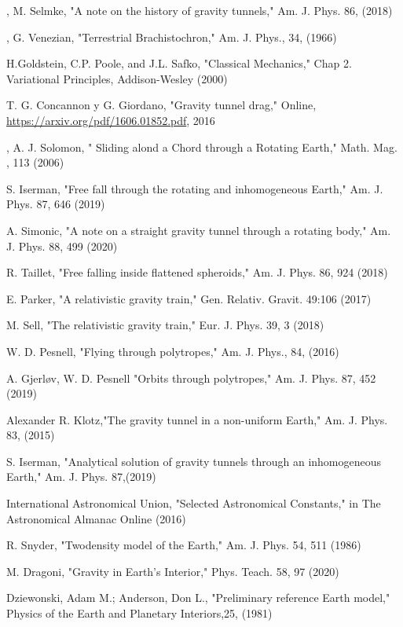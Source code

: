 \documentclass[aps,twocolumn,showpacs,preprintnumbers]{revtex4}
\begin{document}
\begin{thebibliography}{10}

, M. Selmke, "A note on the history of gravity tunnels," Am. J. Phys. 86, (2018)


, G. Venezian, "Terrestrial Brachistochron," Am. J. Phys., 34, (1966)

 H.Goldstein, C.P. Poole, and J.L. Safko, "Classical Mechanics," Chap 2. Variational Principles, Addison-Wesley (2000)

 T. G. Concannon y G. Giordano, "Gravity tunnel drag," Online, \url{https://arxiv.org/pdf/1606.01852.pdf},  2016

, A. J. Solomon, " Sliding alond a Chord through a Rotating Earth,"  Math. Mag. , 113 (2006)

 S. Iserman, "Free fall through the rotating and inhomogeneous Earth," Am. J. Phys. 87, 646 (2019)

 A. Simonic, "A note on a straight gravity tunnel through a rotating body," Am. J. Phys. 88, 499 (2020)

 R. Taillet, "Free falling inside flattened spheroids," Am. J. Phys. 86, 924 (2018)

 E. Parker, "A relativistic gravity train," Gen. Relativ. Gravit.  49:106 (2017)

 M. Sell, "The relativistic gravity train," Eur. J. Phys. 39, 3 (2018) 

 W. D. Pesnell, "Flying through polytropes," Am. J. Phys., 84, (2016)    

 A. Gjerl\o v, W. D. Pesnell "Orbits through polytropes," Am. J. Phys. 87, 452 (2019)    

 Alexander R. Klotz,"The gravity tunnel in a non-uniform Earth," Am. J. Phys. 83, (2015)

 S. Iserman, "Analytical solution of gravity tunnels through an inhomogeneous Earth," Am. J. Phys. 87,(2019)
    
 International Astronomical Union,  "Selected Astronomical Constants,"  in The Astronomical Almanac Online (2016)

 R. Snyder, "Twodensity model of the Earth," Am. J. Phys. 54, 511 (1986)

 M. Dragoni, "Gravity in Earth’s Interior," Phys. Teach. 58, 97 (2020) 

 Dziewonski, Adam M.; Anderson, Don L., "Preliminary reference Earth model," Physics of the Earth and Planetary Interiors,25, (1981)









    



\end{thebibliography}
\end{document}
